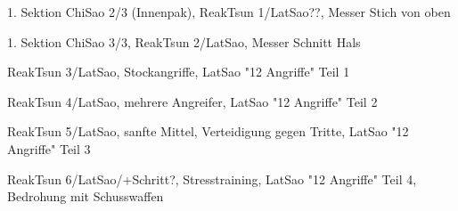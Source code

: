 \begin{WTGradSG}{7}

1. Sektion ChiSao 2/3 (Innenpak), ReakTsun 1/LatSao??, Messer Stich von oben

\end{WTGradSG}
\begin{WTGradSG}{8}

1. Sektion ChiSao 3/3, ReakTsun 2/LatSao, Messer Schnitt Hals

\end{WTGradSG}
\begin{WTGradSG}{9}

ReakTsun 3/LatSao, Stockangriffe, LatSao "12 Angriffe" Teil 1

\end{WTGradSG}
\begin{WTGradSG}{10}

ReakTsun 4/LatSao, mehrere Angreifer, LatSao "12 Angriffe" Teil 2

\end{WTGradSG}
\begin{WTGradSG}{11}

ReakTsun 5/LatSao, sanfte Mittel, Verteidigung gegen Tritte, LatSao "12 Angriffe" Teil 3

\end{WTGradSG}
\begin{WTGradSG}{12}

ReakTsun 6/LatSao/+Schritt?, Stresstraining, LatSao "12 Angriffe" Teil 4, Bedrohung mit Schusswaffen

\end{WTGradSG}




